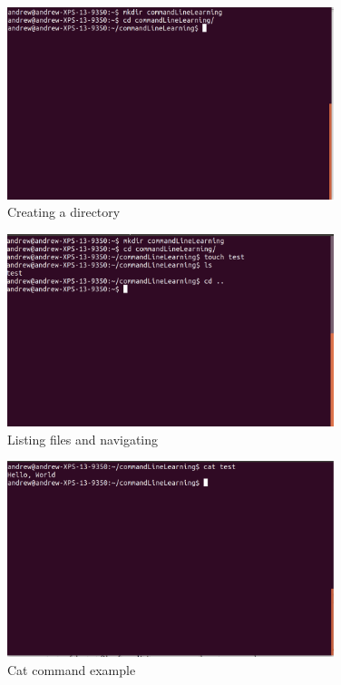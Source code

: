 \begin{figure}
	\centering
	\includegraphics[width=0.85\textwidth]{images/commandLineTwo.png}
	\caption{Creating a directory}
	\label{fig:linux:two}
\end{figure}

\begin{figure}
	\centering
	\includegraphics[width=0.85\textwidth]{images/commandLineThree.png}
	\caption{Listing files and navigating}
	\label{fig:linux:three}
\end{figure}

\begin{figure}[ht]
	\centering
	\includegraphics[width=0.85\textwidth]{images/commandLineFour.png}
	\caption{Cat command example}
	\label{fig:linux:four}
\end{figure}

